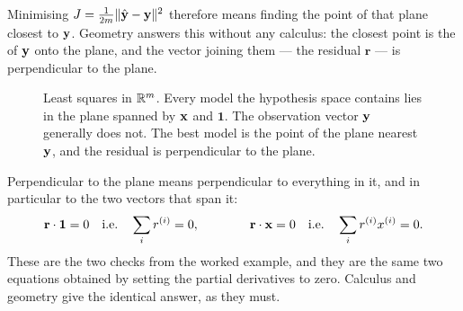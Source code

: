 Minimising $J = \frac{1}{2m}\|\hat{\mathbf{y}} - \mathbf{y}\|^2$ therefore means finding the
point of that plane closest to $\mathbf{y}$. Geometry answers this without any
calculus: the closest point is the  of $\mathbf{y}$ onto
the plane, and the vector joining them --- the residual $\mathbf{r}$ --- is
perpendicular to the plane.

\begin{figure}[htbp]
  \centering
  \caption{Least squares in $\mathbb{R}^{m}$. Every model the hypothesis space
  contains lies in the plane spanned by $\mathbf{x}$ and $\mathbf{1}$. The observation
  vector $\mathbf{y}$ generally does not. The best model is the point of the plane
  nearest $\mathbf{y}$, and the residual is perpendicular to the plane.}
  \label{fig:projection}
\end{figure}

Perpendicular to the plane means perpendicular to everything in it, and in
particular to the two vectors that span it:
\[
  \mathbf{r}\cdot\mathbf{1} = 0
  \quad\text{i.e.}\quad \sum_i r^{(i)} = 0,
  \qquad\qquad
  \mathbf{r}\cdot\mathbf{x} = 0
  \quad\text{i.e.}\quad \sum_i r^{(i)}x^{(i)} = 0 .
\]
These are the two checks from the worked example, and they are the same two
equations obtained by setting the partial derivatives to zero. Calculus and
geometry give the identical answer, as they must.

